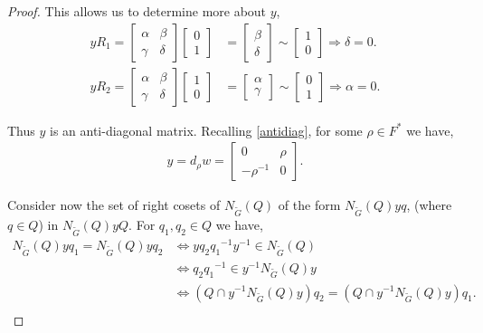 \documentclass[a4paper , 11pt]{book}
\theoremstyle{definition}
\theoremstyle{remark}
\begin{document}
\begin{proof}
This allows us to determine more about $y$,
\begin{align*} y R_1 = \begin{bmatrix} \alpha & \beta \\ \gamma & \delta \end{bmatrix} \begin{bmatrix} 0 \\ 1 \end{bmatrix} &= \begin{bmatrix} \beta \\ \delta \end{bmatrix} \sim \begin{bmatrix} 1 \\ 0 \end{bmatrix} \Longrightarrow \delta = 0.
\\[1.5ex] y R_2 = \begin{bmatrix} \alpha & \beta \\ \gamma & \delta \end{bmatrix} \begin{bmatrix} 1 \\ 0 \end{bmatrix} &= \begin{bmatrix} \alpha \\ \gamma \end{bmatrix} \sim \begin{bmatrix} 0 \\ 1 \end{bmatrix} \Longrightarrow \alpha = 0.
\end{align*}

Thus $y$ is an anti-diagonal matrix. Recalling \eqref{antidiag}, for some $\rho \in F^*$ we have,
\begin{align*} y = d_\rho w = \begin{bmatrix} 0 & \rho \\ -\rho^{-1} & 0 \end{bmatrix}.
\end{align*}

Consider now the set of right cosets of $N_{\widetilde{G}}(Q)$ of the form $N_{\widetilde{G}}(Q) y q$, (where $q \in Q$) in $N_{\widetilde{G}}(Q) y Q$. For $q_1, q_2 \in Q$ we have,
\vspace{2mm}
\begin{align*} N_{\widetilde{G}}(Q) y q_1 = N_{\widetilde{G}}(Q) y q_2 &\iff y q_2 {q_1}^{-1} y^{-1} \in N_{\widetilde{G}}(Q)
\\ &\iff q_2 {q_1}^{-1} \in y^{-1} N_{\widetilde{G}}(Q) y
\\ &\iff (Q \cap y^{-1} N_{\widetilde{G}}(Q) y) q_2 = (Q \cap y^{-1} N_{\widetilde{G}}(Q) y) q_1. \\
\end{align*}


\end{proof}
\end{document}
